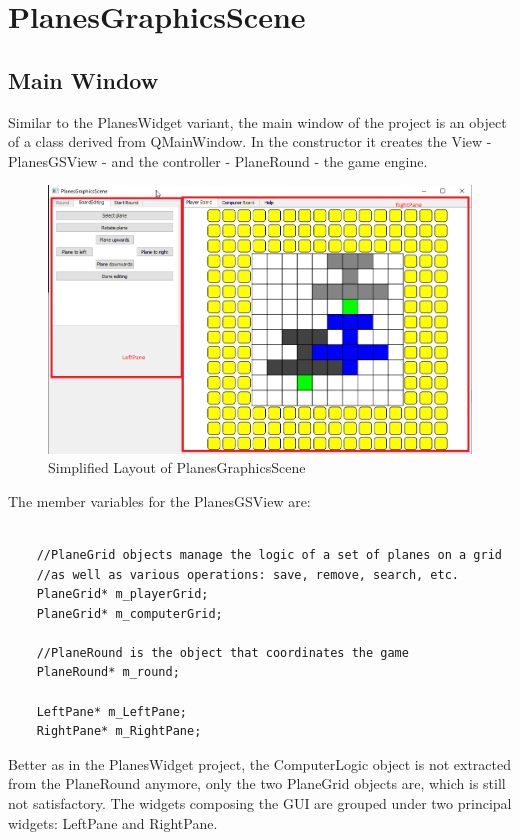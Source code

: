 \section {PlanesGraphicsScene}

\subsection{Main Window}

Similar to the PlanesWidget variant, the main window of the project is an object of a class derived from QMainWindow. In the constructor it creates the View - PlanesGSView - and the controller - PlaneRound - the game engine. 

\begin{figure}[h]
	\includegraphics[width = \textwidth]{PlanesGraphicsScene_BoardEditing_WidgetNames.png}
	\caption{Simplified Layout of PlanesGraphicsScene}
	\label{fig:planesgraphicsscene_boardediting_widgetnames}
\end{figure}

The member variables for the PlanesGSView are:

\begin{lstlisting}

	//PlaneGrid objects manage the logic of a set of planes on a grid
	//as well as various operations: save, remove, search, etc.
	PlaneGrid* m_playerGrid;
	PlaneGrid* m_computerGrid;
	
	//PlaneRound is the object that coordinates the game
	PlaneRound* m_round;
	
	LeftPane* m_LeftPane;
	RightPane* m_RightPane;

\end{lstlisting}

Better as in the PlanesWidget project, the ComputerLogic object is not extracted from the PlaneRound anymore, only the two PlaneGrid objects are, which is still not satisfactory. The widgets composing the GUI are grouped under two principal widgets: LeftPane and RightPane.

